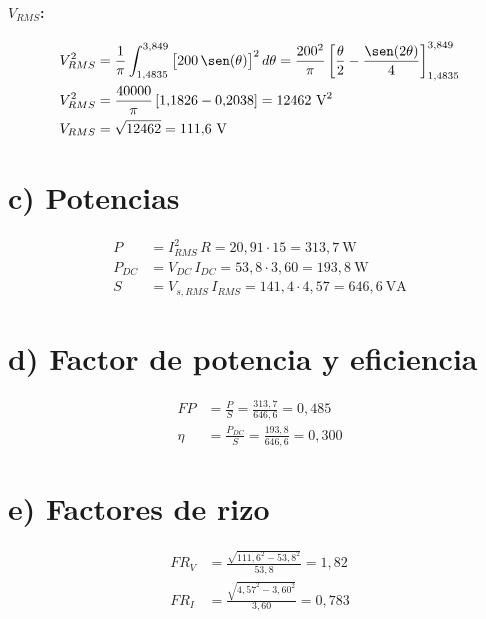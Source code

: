 \documentclass[11pt]{article}
\begin{document}
\paragraph{$V_{RMS}$:}
\begin{align*}
V_{RMS}^2 &= \frac{1}{\pi}\int_{1{,}4835}^{3{,}849} \big[200\,\sen(\theta)\big]^2\,d\theta
          = \frac{200^2}{\pi}\left[\frac{\theta}{2}-\frac{\sen(2\theta)}{4}\right]_{1{,}4835}^{3{,}849} \\
V_{RMS}^2 &= \frac{40000}{\pi}\left[1{,}1826 - 0{,}2038\right] = 12462\ \text{V}^2 \\
V_{RMS} &= \sqrt{12462} = 111{,}6\ \text{V}
\end{align*}

\section*{c) Potencias}

\begin{align*}
P &= I_{RMS}^2\,R = 20{,}91 \cdot 15 = 313{,}7\ \text{W} \\
P_{DC} &= V_{DC}\,I_{DC} = 53{,}8 \cdot 3{,}60 = 193{,}8\ \text{W} \\
S &= V_{s,RMS}\,I_{RMS} = 141{,}4 \cdot 4{,}57 = 646{,}6\ \text{VA}
\end{align*}

\section*{d) Factor de potencia y eficiencia}

\begin{align*}
FP &= \frac{P}{S} = \frac{313{,}7}{646{,}6} = 0{,}485 \\
\eta &= \frac{P_{DC}}{S} = \frac{193{,}8}{646{,}6} = 0{,}300
\end{align*}

\section*{e) Factores de rizo}

\begin{align*}
FR_V &= \frac{\sqrt{111{,}6^2 - 53{,}8^2}}{53{,}8} = 1{,}82 \\
FR_I &= \frac{\sqrt{4{,}57^2 - 3{,}60^2}}{3{,}60} = 0{,}783
\end{align*}
\end{document}
